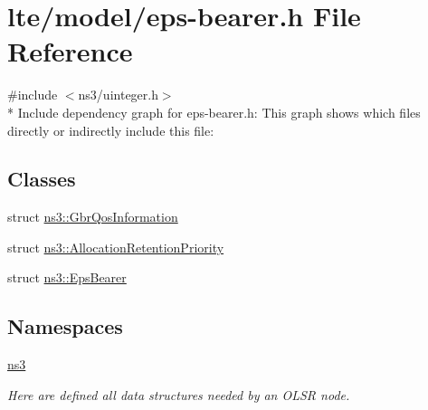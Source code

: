 \hypertarget{eps-bearer_8h}{}\section{lte/model/eps-\/bearer.h File Reference}
\label{eps-bearer_8h}
{\ttfamily \#include $<$ns3/uinteger.\+h$>$}\\*
Include dependency graph for eps-\/bearer.h\+:
This graph shows which files directly or indirectly include this file\+:
\subsection*{Classes}
\begin{DoxyCompactItemize}
\item 
struct \hyperlink{structns3_1_1GbrQosInformation}{ns3\+::\+Gbr\+Qos\+Information}
\item 
struct \hyperlink{structns3_1_1AllocationRetentionPriority}{ns3\+::\+Allocation\+Retention\+Priority}
\item 
struct \hyperlink{structns3_1_1EpsBearer}{ns3\+::\+Eps\+Bearer}
\end{DoxyCompactItemize}
\subsection*{Namespaces}
\begin{DoxyCompactItemize}
\item 
 \hyperlink{namespacens3}{ns3}
\begin{DoxyCompactList}\small\item\em Here are defined all data structures needed by an O\+L\+SR node. \end{DoxyCompactList}\end{DoxyCompactItemize}
